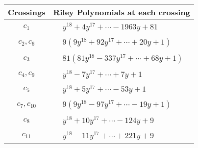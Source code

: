 \documentclass[1p]{elsarticle_modified}
\theoremstyle{definition}
\begin{document}
\begin{tabular}{m{50pt}|m{274pt}}
Crossings & \hspace{64pt}Riley Polynomials at each crossing \\
\hline $$\begin{aligned}c_{1}\end{aligned}$$&$\begin{aligned}
&y^{18}+4 y^{17}+\cdots-1963 y+81
\end{aligned}$\\
\hline $$\begin{aligned}c_{2},c_{6}\end{aligned}$$&$\begin{aligned}
&9(9 y^{18}+92 y^{17}+\cdots+20 y+1)
\end{aligned}$\\
\hline $$\begin{aligned}c_{3}\end{aligned}$$&$\begin{aligned}
&81(81 y^{18}-337 y^{17}+\cdots+68 y+1)
\end{aligned}$\\
\hline $$\begin{aligned}c_{4},c_{9}\end{aligned}$$&$\begin{aligned}
&y^{18}-7 y^{17}+\cdots+7 y+1
\end{aligned}$\\
\hline $$\begin{aligned}c_{5}\end{aligned}$$&$\begin{aligned}
&y^{18}+5 y^{17}+\cdots-53 y+1
\end{aligned}$\\
\hline $$\begin{aligned}c_{7},c_{10}\end{aligned}$$&$\begin{aligned}
&9(9 y^{18}-97 y^{17}+\cdots-19 y+1)
\end{aligned}$\\
\hline $$\begin{aligned}c_{8}\end{aligned}$$&$\begin{aligned}
&y^{18}+10 y^{17}+\cdots-124 y+9
\end{aligned}$\\
\hline $$\begin{aligned}c_{11}\end{aligned}$$&$\begin{aligned}
&y^{18}-11 y^{17}+\cdots+221 y+9
\end{aligned}$\\
\hline
\end{tabular}\\~\\
\end{document}
